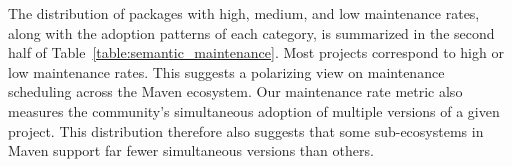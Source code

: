 \documentclass[conference]{IEEEtran}
\begin{document}



The distribution of packages with high, medium, and low maintenance rates, along with the adoption patterns of each category, is summarized in the second half of Table~\ref{table:semantic_maintenance}.
%
Most projects correspond to high or low maintenance rates. This suggests a polarizing view on maintenance scheduling across the Maven ecosystem. Our maintenance rate metric also measures the community's simultaneous adoption of multiple versions of a given project. This distribution therefore also suggests that some sub-ecosystems in Maven support far fewer simultaneous versions than others. 

\end{document}

